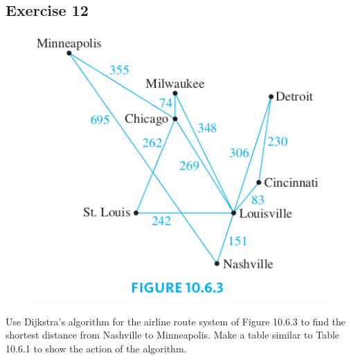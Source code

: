 \documentclass[14pt]{extarticle}
\begin{document}
\subsection{Exercise 12}
\begin{figure}[ht!]
\centering
\includegraphics[scale=0.5]{../images/10.6.12.png}
\end{figure}

Use Dijkstra’s algorithm for the airline route system of Figure 10.6.3 to find the shortest distance from Nashville to 
Minneapolis. Make a table similar to Table 10.6.1 to show the action of the algorithm.
\end{document}
